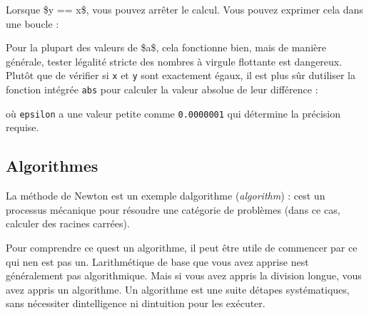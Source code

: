 Lorsque \$y == x\$, vous pouvez arrêter le calcul. Vous pouvez exprimer
cela dans une boucle :

\begin{Shaded}
\begin{Highlighting}[]
 \NormalTok{:}
\OperatorTok{=}\OperatorTok{+}\OperatorTok{/}\OperatorTok{/} 
    \OperatorTok{==}
\OperatorTok{=}
\end{Highlighting}
\end{Shaded}

Pour la plupart des valeurs de \$a\$, cela fonctionne bien, mais de
manière générale, tester l\textquotesingle égalité stricte des nombres à
virgule flottante est dangereux. Plutôt que de vérifier si \texttt{x} et
\texttt{y} sont exactement égaux, il est plus sûr
d\textquotesingle utiliser la fonction intégrée \texttt{abs} pour
calculer la valeur absolue de leur différence :

\begin{Shaded}
\begin{Highlighting}[]
 \OperatorTok{{-}}\OperatorTok{\textless{}}
\end{Highlighting}
\end{Shaded}

où \texttt{epsilon} a une valeur petite comme \texttt{0.0000001} qui
détermine la précision requise.

\hypertarget{algorithmes}{%
\subsection{Algorithmes}\label{algorithmes}}

La méthode de Newton est un exemple d\textquotesingle algorithme
(\emph{algorithm}) : c\textquotesingle est un processus mécanique pour
résoudre une catégorie de problèmes (dans ce cas, calculer des racines
carrées).

Pour comprendre ce qu\textquotesingle est un algorithme, il peut être
utile de commencer par ce qui n\textquotesingle en est pas un.
L\textquotesingle arithmétique de base que vous avez apprise
n\textquotesingle est généralement pas algorithmique. Mais si vous avez
appris la division longue, vous avez appris un algorithme. Un algorithme
est une suite d\textquotesingle étapes systématiques, sans nécessiter
d\textquotesingle intelligence ni d\textquotesingle intuition pour les
exécuter.

